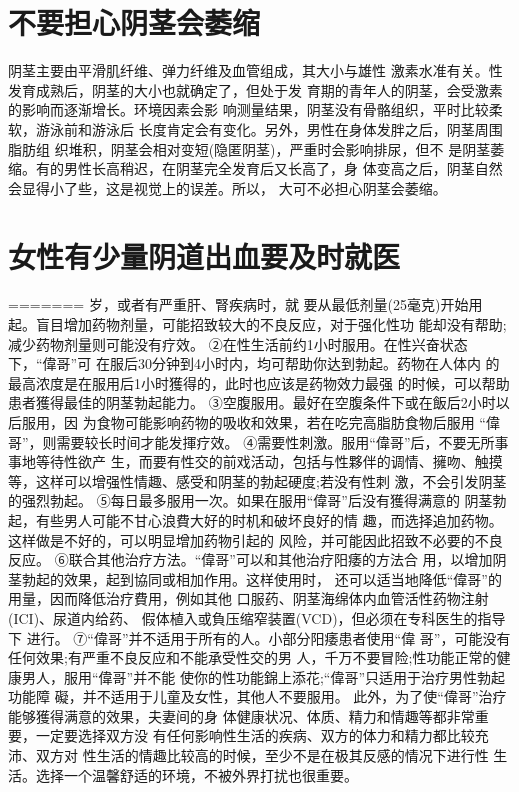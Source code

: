 \documentclass[12pt,UTF8]{ctexbook}
\begin{document}
\section{不要担心阴茎会萎缩}
阴茎主要由平滑肌纤维、弹力纤维及血管组成，其大小与雄性
激素水准有关。性发育成熟后，阴茎的大小也就确定了，但处于发
育期的青年人的阴茎，会受激素的影响而逐渐增长。环境因素会影
响测量结果，阴茎没有骨骼组织，平时比较柔软，游泳前和游泳后
长度肯定会有变化。另外，男性在身体发胖之后，阴茎周围脂肪组
织堆积，阴茎会相对变短(隐匿阴茎)，严重时会影响排尿，但不
是阴茎萎缩。有的男性长高稍迟，在阴茎完全发育后又长高了，身
体变高之后，阴茎自然会显得小了些，这是视觉上的误差。所以，
大可不必担心阴茎会萎缩。

\section{女性有少量阴道出血要及时就医}
=======
岁，或者有严重肝、腎疾病时，就
要从最低剂量(25毫克)开始用
起。盲目增加药物剂量，可能招致较大的不良反应，对于强化性功
能却没有帮助;减少药物剂量则可能没有疗效。
②在性生活前约1小时服用。在性兴奋状态下，“偉哥”可
在服后30分钟到4小时内，均可帮助你达到勃起。药物在人体内
的最高浓度是在服用后1小时獲得的，此时也应该是药物效力最强
的时候，可以帮助患者獲得最佳的阴茎勃起能力。
③空腹服用。最好在空腹条件下或在飯后2小时以后服用，因
为食物可能影响药物的吸收和效果，若在吃完高脂肪食物后服用
“偉哥”，则需要较长时间才能发揮疗效。
④需要性刺激。服用“偉哥”后，不要无所事事地等待性欲产
生，而要有性交的前戏活动，包括与性夥伴的调情、擁吻、触摸
等，这样可以增强性情趣、感受和阴茎的勃起硬度;若没有性刺
激，不会引发阴茎的强烈勃起。
⑤每日最多服用一次。如果在服用“偉哥”后没有獲得满意的
阴茎勃起，有些男人可能不甘心浪費大好的时机和破坏良好的情
趣，而选择追加药物。这样做是不好的，可以明显增加药物引起的
风险，并可能因此招致不必要的不良反应。
⑥联合其他治疗方法。“偉哥”可以和其他治疗阳痿的方法合
用，以增加阴茎勃起的效果，起到協同或相加作用。这样使用时，
还可以适当地降低“偉哥”的用量，因而降低治疗費用，例如其他
口服药、阴茎海绵体内血管活性药物注射(ICI)、尿道内给药、
假体植入或負压缩窄装置(VCD)，但必须在专科医生的指导下
进行。
⑦“偉哥”并不适用于所有的人。小部分阳痿患者使用“偉
哥”，可能没有任何效果;有严重不良反应和不能承受性交的男
人，千万不要冒险;性功能正常的健康男人，服用“偉哥”并不能
使你的性功能錦上添花;“偉哥”只适用于治疗男性勃起功能障
礙，并不适用于儿童及女性，其他人不要服用。
此外，为了使“偉哥”治疗能够獲得满意的效果，夫妻间的身
体健康状况、体质、精力和情趣等都非常重要，一定要选择双方没
有任何影响性生活的疾病、双方的体力和精力都比较充沛、双方对
性生活的情趣比较高的时候，至少不是在极其反感的情况下进行性
生活。选择一个温馨舒适的环境，不被外界打扰也很重要。
\end{document}
